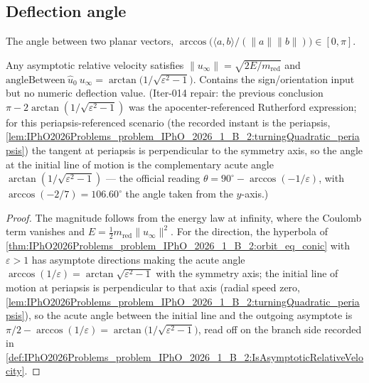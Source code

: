 \subsection*{Deflection angle}

\begin{definition}
\label{def:IPhO2026Problems_problem_IPhO_2026_1_B_2:angleBetween}
The angle between two planar vectors,
$\arccos\!\big(\langle a, b\rangle / (\lVert a \rVert \lVert b
\rVert)\big) \in [0, \pi]$.
\end{definition}

\begin{theorem}
\label{thm:IPhO2026Problems_problem_IPhO_2026_1_B_2:signed_deflection_eq_formula}
Any asymptotic relative velocity satisfies
$\lVert u_\infty \rVert = \sqrt{2E/m_{\mathrm{red}}}$ and
$\mathrm{angleBetween}\ \hat u_0\ u_\infty
= \arctan\!\big(1/\sqrt{\varepsilon^2 - 1}\big)$.
Contains the sign/orientation input but no numeric deflection value.
(Iter-014 repair: the previous conclusion
$\pi - 2\arctan(1/\sqrt{\varepsilon^2-1})$ was the apocenter-referenced
Rutherford expression; for this periapsis-referenced scenario (the
recorded instant is the periapsis,
\cref{lem:IPhO2026Problems_problem_IPhO_2026_1_B_2:turningQuadratic_periapsis})
the tangent at periapsis is perpendicular to the symmetry axis, so the
angle at the initial line of motion is the complementary acute angle
$\arctan(1/\sqrt{\varepsilon^2-1})$ --- the official reading
$\theta = 90^\circ - \arccos(-1/\varepsilon)$, with
$\arccos(-2/7) = 106.60^\circ$ the angle taken from the $y$-axis.)
\end{theorem}
\begin{proof}
The magnitude follows from the energy law at infinity, where the Coulomb
term vanishes and $E = \tfrac12 m_{\mathrm{red}} \lVert u_\infty \rVert^2$.
For the direction, the hyperbola of
\cref{thm:IPhO2026Problems_problem_IPhO_2026_1_B_2:orbit_eq_conic} with
$\varepsilon > 1$ has asymptote directions making the acute angle
$\arccos(1/\varepsilon) = \arctan\sqrt{\varepsilon^2 - 1}$ with the
symmetry axis; the initial line of motion at periapsis is perpendicular to
that axis (radial speed zero,
\cref{lem:IPhO2026Problems_problem_IPhO_2026_1_B_2:turningQuadratic_periapsis}),
so the acute angle between the initial line and the outgoing asymptote is
$\pi/2 - \arccos(1/\varepsilon)
 = \arctan\!\big(1/\sqrt{\varepsilon^2 - 1}\big)$, read off on the
branch side recorded in
\cref{def:IPhO2026Problems_problem_IPhO_2026_1_B_2:IsAsymptoticRelativeVelocity}.
\end{proof}

